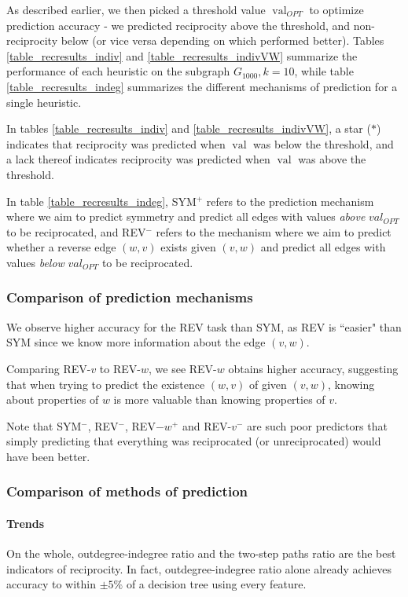 \documentclass[conference]{IEEEtran}
\begin{document}
As described earlier, we then picked a threshold value $\operatorname{val}_{OPT}$ to optimize prediction accuracy - we predicted reciprocity above the threshold, and non-reciprocity below (or vice versa depending on which performed better). 
Tables \ref{table_recresults_indiv} and \ref{table_recresults_indivVW} summarize the performance of each heuristic on the subgraph $G_{1000}, k=10$, while 
table \ref{table_recresults_indeg} summarizes the different mechanisms of prediction for a single heuristic.

In tables \ref{table_recresults_indiv} and \ref{table_recresults_indivVW}, a star ($*$) indicates that reciprocity was predicted when $\operatorname{val}$ was below the threshold, and a lack thereof indicates reciprocity was predicted when $\operatorname{val}$ was above the threshold.

In table \ref{table_recresults_indeg}, SYM$^+$ refers to the prediction mechanism where we aim to predict symmetry and predict all edges with values \emph{above} $val_{OPT}$ to be reciprocated, and REV$^-$ refers to the mechanism where we aim to predict whether a reverse edge $(w,v)$ exists given $(v,w)$ and predict all edges with values \emph{below} $val_{OPT}$ to be reciprocated. 

\subsubsection{Comparison of prediction mechanisms}
We observe higher accuracy for the REV task than SYM, as REV is ``easier" than SYM 
since we know more information about the edge $(v,w)$.

Comparing REV-$v$ to REV-$w$, we see REV-$w$ obtains higher accuracy, suggesting that when trying to predict the existence $(w,v)$ of given $(v,w)$, knowing about properties of $w$ is more valuable than knowing properties of $v$.

Note that SYM$^-$, REV$^-$, REV$-w^+$ and REV-$v^-$ are such poor predictors that simply predicting that everything was reciprocated (or unreciprocated) would have been better.

\subsubsection{Comparison of methods of prediction}

\paragraph{Trends}
On the whole, outdegree-indegree ratio and the two-step paths ratio are the best indicators of reciprocity. 
In fact, outdegree-indegree ratio alone already achieves accuracy to within $\pm 5\%$ of a decision tree using every feature.
\end{document}
